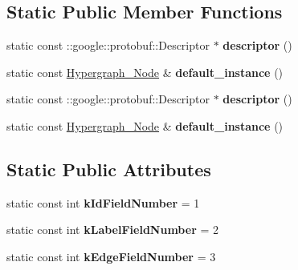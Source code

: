 \subsection*{Static Public Member Functions}
\begin{DoxyCompactItemize}
\item 
\hypertarget{classHypergraph__Node_ade18e8c34270334ea2efbdb51c98f8ba}{
static const ::google::protobuf::Descriptor $\ast$ {\bfseries descriptor} ()}
\label{classHypergraph__Node_ade18e8c34270334ea2efbdb51c98f8ba}

\item 
\hypertarget{classHypergraph__Node_aadf2ad399be5fa4ac268a46e73a2fe0d}{
static const \hyperlink{classHypergraph__Node}{Hypergraph\_\-Node} \& {\bfseries default\_\-instance} ()}
\label{classHypergraph__Node_aadf2ad399be5fa4ac268a46e73a2fe0d}

\item 
\hypertarget{classHypergraph__Node_af8c74ba69c3a67dc7ef5f1ba816a7f35}{
static const ::google::protobuf::Descriptor $\ast$ {\bfseries descriptor} ()}
\label{classHypergraph__Node_af8c74ba69c3a67dc7ef5f1ba816a7f35}

\item 
\hypertarget{classHypergraph__Node_a938861e0ccae279a5df0c0eb7364c423}{
static const \hyperlink{classHypergraph__Node}{Hypergraph\_\-Node} \& {\bfseries default\_\-instance} ()}
\label{classHypergraph__Node_a938861e0ccae279a5df0c0eb7364c423}

\end{DoxyCompactItemize}
\subsection*{Static Public Attributes}
\begin{DoxyCompactItemize}
\item 
\hypertarget{classHypergraph__Node_a02f37c3292bd8fabd0ba4a19361af78d}{
static const int {\bfseries kIdFieldNumber} = 1}
\label{classHypergraph__Node_a02f37c3292bd8fabd0ba4a19361af78d}

\item 
\hypertarget{classHypergraph__Node_ad231ad3931e876829c3cf9d3c139d862}{
static const int {\bfseries kLabelFieldNumber} = 2}
\label{classHypergraph__Node_ad231ad3931e876829c3cf9d3c139d862}

\item 
\hypertarget{classHypergraph__Node_ab2407c760d8d8d60fa85583555b6f652}{
static const int {\bfseries kEdgeFieldNumber} = 3}
\label{classHypergraph__Node_ab2407c760d8d8d60fa85583555b6f652}

\end{DoxyCompactItemize}
